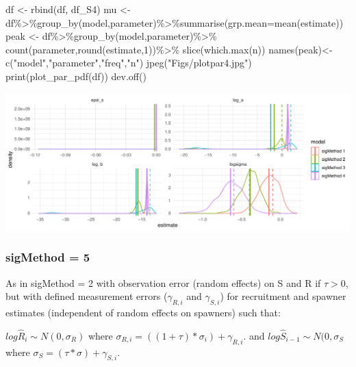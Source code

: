 \documentclass[
]{article}
\newenvironment{Shaded}{\begin{snugshade}}{\end{snugshade}}
\newcommand{\AttributeTok}[1]{\textcolor[rgb]{0.77,0.63,0.00}{#1}}
\newcommand{\DecValTok}[1]{\textcolor[rgb]{0.00,0.00,0.81}{#1}}
\newcommand{\FunctionTok}[1]{\textcolor[rgb]{0.00,0.00,0.00}{#1}}
\newcommand{\NormalTok}[1]{#1}
\newcommand{\OtherTok}[1]{\textcolor[rgb]{0.56,0.35,0.01}{#1}}
\newcommand{\SpecialCharTok}[1]{\textcolor[rgb]{0.00,0.00,0.00}{#1}}
\newcommand{\StringTok}[1]{\textcolor[rgb]{0.31,0.60,0.02}{#1}}
\begin{document}
\begin{Shaded}
\begin{Highlighting}[]
\NormalTok{  df }\OtherTok{\textless{}{-}} \FunctionTok{rbind}\NormalTok{(df, df\_S4)}
\NormalTok{  mu   }\OtherTok{\textless{}{-}}\NormalTok{ df}\SpecialCharTok{\%\textgreater{}\%}\FunctionTok{group\_by}\NormalTok{(model,parameter)}\SpecialCharTok{\%\textgreater{}\%}\FunctionTok{summarise}\NormalTok{(}\AttributeTok{grp.mean=}\FunctionTok{mean}\NormalTok{(estimate))}
\NormalTok{  peak }\OtherTok{\textless{}{-}}\NormalTok{ df}\SpecialCharTok{\%\textgreater{}\%}\FunctionTok{group\_by}\NormalTok{(model,parameter)}\SpecialCharTok{\%\textgreater{}\%}
    \FunctionTok{count}\NormalTok{(parameter,}\FunctionTok{round}\NormalTok{(estimate,}\DecValTok{1}\NormalTok{))}\SpecialCharTok{\%\textgreater{}\%}
    \FunctionTok{slice}\NormalTok{(}\FunctionTok{which.max}\NormalTok{(n))}
  \FunctionTok{names}\NormalTok{(peak)}\OtherTok{\textless{}{-}} \FunctionTok{c}\NormalTok{(}\StringTok{"model"}\NormalTok{,}\StringTok{"parameter"}\NormalTok{,}\StringTok{"freq"}\NormalTok{,}\StringTok{"n"}\NormalTok{)}
  \FunctionTok{jpeg}\NormalTok{(}\StringTok{"Figs/plotpar4.jpg"}\NormalTok{)}
  \FunctionTok{print}\NormalTok{(}\FunctionTok{plot\_par\_pdf}\NormalTok{(df))}
  \FunctionTok{dev.off}\NormalTok{()}
\end{Highlighting}
\end{Shaded}

\includegraphics{futR_demo_files/figure-latex/plot4-1.pdf}

\hypertarget{sigmethod-5-1}{%
\subsubsection{sigMethod = 5}\label{sigmethod-5-1}}

As in sigMethod = 2 with observation error (random effects) on S and R
if \(\tau >0\), but with defined measurement errors (\(\gamma_{R,i}\)
and \(\gamma_{S,i}\)) for recruitment and spawner estimates (independent
of random effects on spawners) such that:

\(log\hat{R}_i\sim N(0,\sigma_R)\) where
\(\sigma_{R,i}=((1+\tau)*\sigma_i)+\gamma_{R,i}\). and
\(log\hat{S}_{i-1} \sim N(0,\sigma_S\) where
\(\sigma_S=(\tau*\sigma)+\gamma_{S,i}\).
\end{document}
